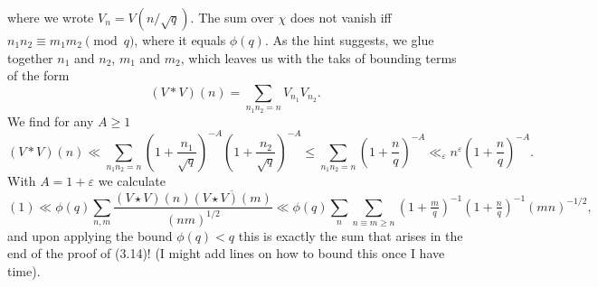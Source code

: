 \documentclass[a4paper,11pt]{article}
\begin{document}
where we wrote $V_n = V(n/\sqrt q)$.
The sum over $\chi$ does not vanish iff $n_1n_2 \equiv m_1m_2 \pmod q$, 
where it equals $\phi(q)$. As the hint suggests, we glue together $n_1$ and $n_2$,
$m_1$ and $m_2$, which leaves us with the taks of bounding terms of the form
\[
    (V * V)(n) = \sum_{n_1 n_2 = n} V_{n_1} V_{n_2}.
\]
We find for any $A \geq 1$
\[
    (V * V)(n) \ll \sum_{n_1n_2 = n} \left(1+\frac {n_1} {\sqrt q} \right)^{-A}
    \left(1+\frac {n_2} {\sqrt q} \right)^{-A} \leq 
    \sum_{n_1 n_2 = n} \left(1+\frac {n} {q} \right)^{-A}
    \ll_{\varepsilon}n^{\varepsilon} \left(1+\frac {n} {q} \right)^{-A}.
\]
With $A = 1+\varepsilon$ we calculate
\begin{equation}
    (1) \ll \phi(q) \sum_{n,m} \frac{(V\star V)(n) \overline{(V\star V)(m)}}{(nm)^{1/2}}
    \ll \phi(q) \sum_n \sum_{n \equiv m \geq n} 
    (1+\tfrac mq)^{-1} (1+\tfrac nq)^{-1} (mn)^{-1/2},
\end{equation}
and upon applying the bound $\phi(q) < q$ this is exactly the sum that
arises in the end of the proof of (3.14)! (I might add lines on how to bound
this once I have time).
 
\contactend
\end{document}

